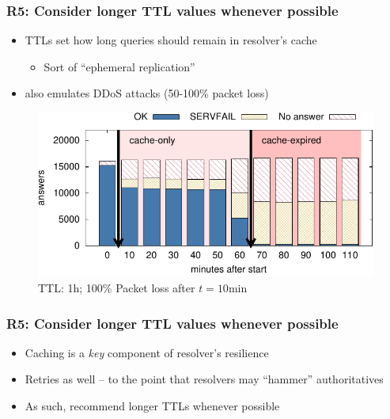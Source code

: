 \documentclass[11pt,show 
notes,notheorems,noamsthm,blank]{beamer} %
\begin{document}
\begin{frame}
 \frametitle{R5: Consider longer TTL values whenever 
possible}
\begin{itemize}
 \item TTLs set how long queries should remain in resolver's cache
\begin{itemize}
   \item Sort of ``ephemeral replication''
\end{itemize}

 \item  \cite{Moura18b}  also emulates DDoS attacks (50-100\% packet loss)

 
\end{itemize}


\begin{figure}
\centering
\includegraphics[width=0.7\columnwidth]{fig/hist.pdf}
 \caption{TTL: 1h; 100\%  Packet loss after $t=10$min}
\label{fig:class-valid-queries}
\end{figure}

\end{frame}


\begin{frame}
 \frametitle{R5: Consider longer TTL values whenever 
possible}
\begin{itemize}
 
 
 \item Caching is a \textit{key} component of resolver's resilience
   \item Retries as well -- to the point that resolvers may ``hammer'' 
authoritatives
   
   
 \item As such, \cite{Moura18b} recommend longer TTLs whenever possible
 
 
 \end{itemize}
 
 
\end{frame}
\end{document}
